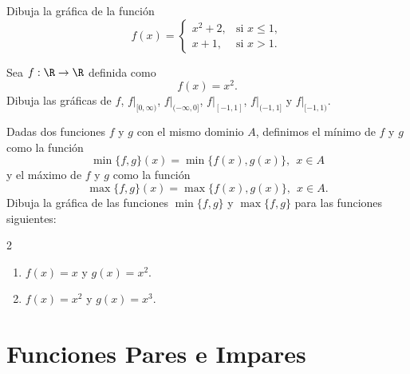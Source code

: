 \documentclass[12pt,a4paper]{book}
\begin{document}
    \begin{ejercicio}\label{ej:95}
        Dibuja la gráfica de la función
        \begin{equation*}
            f(x)=\begin{cases}
                x^{2}+2, & \text{si }x\leq 1,\\
                x+1, & \text{si }x>1.
            \end{cases}
        \end{equation*}
    \end{ejercicio}

    \begin{ejercicio}\label{ej:96}
        Sea $f:\R\to\R$ definida como
        \begin{equation*}
            f(x)=x^{2}.
        \end{equation*}
        Dibuja las gráficas de $f$, $f|_{[0,\infty)}$, $f|_{(-\infty,0]}$, $f|_{[-1,1]}$, $f|_{(-1,1]}$ y $f|_{[-1,1)}$.
    \end{ejercicio}

    \begin{ejercicio}\label{ej:97}
        Dadas dos funciones
        $f$ y $g$ con el mismo dominio $A$, definimos el mínimo de $f$ y $g$ como la
        función
        \begin{equation*}
            \min\{f,g\}(x)=\min\{f(x),g(x)\},\ \ x\in A
        \end{equation*}
        y el máximo de $f$ y $g$ como la función
        \begin{equation*}
            \max\{f,g\}(x)=\max\{f(x),g(x)\},\ \ x\in A.
        \end{equation*}
        Dibuja la gráfica de las funciones $\min\{f,g\}$ y $\max\{f,g\}$ para las funciones
        siguientes:
        \begin{multicols}{2}
        \begin{enumerate}[nosep]
            \item $f(x)=x$ y $g(x)=x^{2}$.
            \item $f(x)=x^{2}$ y $g(x)=x^{3}$.
        \end{enumerate}
        \end{multicols}
    \end{ejercicio}

    \section{Funciones Pares e Impares}
\end{document}

